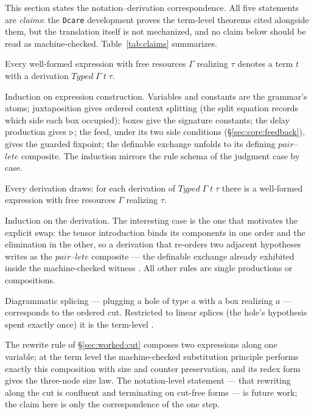 \documentclass{eptcs}
\begin{document}
This section states the notation--derivation correspondence. All five
statements are \emph{claims}: the \texttt{Dcare} development proves the
term-level theorems cited alongside them, but the translation itself is
not mechanized, and no claim below should be read as machine-checked.
Table~\ref{tab:claims} summarizes.

\begin{claim}[soundness]\label{cl:sound}\claimS
Every well-formed expression with free resources
$\Gamma$ realizing $\tau$ denotes a term $t$ with a derivation $\mathit{Typed}\;\Gamma\;t\;\tau$.
\end{claim}
\begin{proofsketch}
Induction on expression construction. Variables and
constants are the grammar's atoms; juxtaposition gives ordered context splitting (the split
equation records which side each box occupied); boxes give the signature
constants; the delay production gives $\triangleright$; the feed, under its two
side conditions (\S\ref{sec:core:feedback}), gives the guarded fixpoint;
the definable exchange unfolds to its defining
$\mathit{pair}$--$\mathit{lete}$ composite. The induction mirrors the rule
schema of the judgment case by case.
\end{proofsketch}

\begin{claim}[completeness]\label{cl:comp}\claimS
Every derivation draws: for each derivation of $\mathit{Typed}\;\Gamma\;t\;\tau$
there is a well-formed expression with free resources $\Gamma$ realizing
$\tau$.
\end{claim}
\begin{proofsketch}
Induction on the derivation. The interesting case is the one that
motivates the explicit swap: the tensor introduction binds its
components in one order and the elimination in the other, so a
derivation that re-orders two adjacent hypotheses writes as the
$\mathit{pair}$--$\mathit{lete}$ composite --- the definable exchange
already exhibited inside the machine-checked witness
 . All other
rules are single productions or compositions.
\end{proofsketch}

\begin{claim}\label{cl:cut}\claimS
Diagrammatic splicing --- plugging a hole of type $a$ with a box
realizing $a$ --- corresponds to the ordered cut. Restricted to linear
splices (the hole's hypothesis spent exactly once) it is the term-level
 .
\end{claim}
\begin{proofsketch}
The rewrite rule of \S\ref{sec:worked:cut} composes two expressions
along one variable; at the term level the machine-checked substitution
principle performs exactly this composition with size and counter
preservation, and its redex form gives the three-node size law. The
notation-level statement --- that rewriting along the cut is confluent
and terminating on cut-free forms --- is future work; the claim here is
only the correspondence of the one step.
\end{proofsketch}
\end{document}
